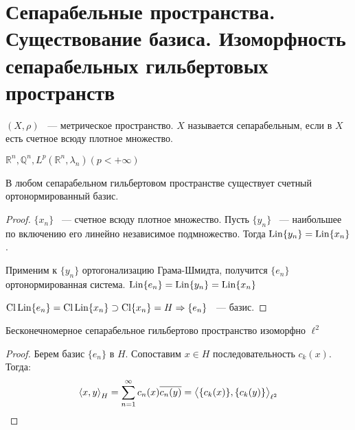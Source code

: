 \section{Сепарабельные пространства. Существование базиса. Изоморфность сепарабельных гильбертовых пространств}

\begin{definition} $(X, \rho)$ ~--- метрическое пространство. $X$ называется сепарабельным,
    если в $X$ есть счетное всюду плотное множество.
    \end{definition}
    
    \begin{examples} $\mathbb{R}^n, \mathbb{Q}^n, L^p(\mathbb{R}^n, \lambda_n) (p < +\infty)$
    \end{examples}
    
    \begin{theorem} В любом сепарабельном гильбертовом пространстве существует счетный
    ортонормированный базис.
    
    \end{theorem}
    
    \begin{proof}
    $\{x_n\}$ ~--- счетное всюду плотное множество. Пусть $\{y_n\}$ ~--- наибольшее по 
    включению его линейно независимое подмножество. Тогда $\operatorname{Lin}\{y_n\} = \operatorname{Lin}\{x_n\}$.
    
    Применим к $\{y_n\}$ ортогонализацию Грама-Шмидта, получится $\{e_n\}$ 
    ортонормированная система.  $\operatorname{Lin}\{e_n\} = \operatorname{Lin}\{y_n\} = \operatorname{Lin}\{x_n\}$
    
    $\operatorname{Cl} \operatorname{Lin}\{e_n\} = \operatorname{Cl} \operatorname{Lin}\{x_n\} \supset \operatorname{Cl} \{x_n\} = H \Rightarrow \{e_n\}$ ~--- базис.
    \end{proof}
    
    \begin{theorem} Бесконечномерное сепарабельное гильбертово пространство изоморфно 
    $\ell^2$
    
    \end{theorem}
    
    \begin{proof}
        Берем базис $\{e_n\}$ в $H$. Сопоставим $x \in H$ последовательность $c_k(x)$. Тогда: 
        \begin{gather*}
            \left\langle x, y \right\rangle_H = \sum\limits_{n=1}^\infty c_n(x)\overline{c_n(y)} = \left\langle \{c_k(x)\}, \{c_k(y)\} \right\rangle_{\ell^2}
        \end{gather*}
    \end{proof}
\newpage

